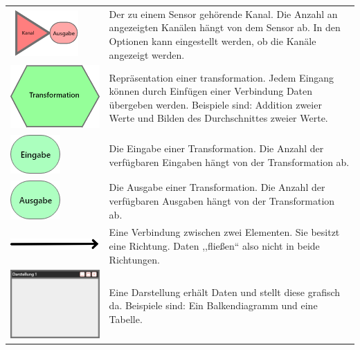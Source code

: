 \documentclass[parskip=full]{scrartcl}
\begin{document}
\begin{tabular}[t]{p{1cm} p{10cm}}
	\vspace{0cm}\includegraphics[width = 1 cm]{Grafik/Kanal.png} & Der zu einem Sensor gehörende Kanal. Die Anzahl an angezeigten Kanälen hängt von dem Sensor ab. In den Optionen kann eingestellt werden, ob die Kanäle angezeigt werden.\newline\\\cline{1-2}
	\vspace{0cm}\includegraphics[width = 1 cm]{Grafik/Verbindungselement.png} & Repräsentation einer \gls{transformation}. Jedem Eingang können durch Einfügen einer Verbindung Daten übergeben werden. Beispiele sind: Addition zweier Werte und Bilden des Durchschnittes zweier Werte.\newline\\
	\vspace{0cm}\includegraphics[width = 1 cm]{Grafik/Eingabe-Verbindung.png} & Die Eingabe einer Transformation. Die Anzahl der verfügbaren Eingaben hängt von der Transformation ab.\newline\\
	\vspace{0cm}\includegraphics[width = 1 cm]{Grafik/Ausgabe-Transformation.png} & Die Ausgabe einer Transformation. Die Anzahl der verfügbaren Ausgaben hängt von der Transformation ab.\newline\\\cline{1-2}

	\vspace{0cm}\includegraphics[width = 1 cm]{Grafik/Verbindungspfeil.png} & Eine Verbindung zwischen zwei Elementen. Sie besitzt eine Richtung. Daten ,,fließen`` also nicht in beide Richtungen.\newline\\\cline{1-2}
	\vspace{0cm}\includegraphics[width = 1 cm]{Grafik/Darstellungsfenster.png} & Eine Darstellung erhält Daten und stellt diese grafisch da. Beispiele sind: Ein Balkendiagramm und eine Tabelle.\newline\\

\end{tabular}
\end{document}
